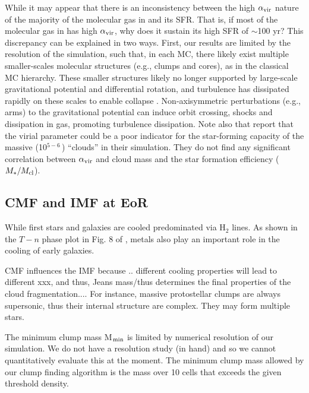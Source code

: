 \documentclass[apj]{emulateapj} %
\begin{document}
{While it may appear that there is an inconsistency between the high $\alpha_{\rm vir}$
nature of the majority of the molecular gas in \flower and its SFR.
That is, if most of the molecular gas in \flower has high $\alpha_{\rm vir}$, why does it sustain its high SFR of $\sim$100\,\Msun\,yr\pmOne?
This discrepancy can be explained in two ways.
First, our results are limited by the resolution of the simulation, such that, in each MC, there
likely exist multiple smaller-scales molecular structures (e.g., clumps and cores),
as in the classical MC hierarchy. These smaller structures likely no longer supported by large-scale gravitational potential and differential rotation,
and turbulence has dissipated rapidly on these scales to enable collapse \citep{Clark04a}.
Non-axisymmetric perturbations (e.g., arms) to the gravitational potential
can induce orbit crossing, shocks and dissipation in gas, promoting turbulence dissipation.
Note also that \citet{Pettitt18a} report that the virial parameter could be a poor indicator
for the star-forming capacity of the massive (10$^{5-6}$\,\Msun) ``clouds'' in their simulation. They
do not find any significant correlation between $\alpha_{\rm vir}$ and cloud mass
and the star formation efficiency ($M_*/M_{\rm cl}$).


\subsection{CMF and IMF at EoR}

While first stars and galaxies are cooled predominated via H$_2$ lines.
As shown in the $T-n$ phase plot in Fig. 8 of \citealt{Pallottini17b}, metals also play an important role in the cooling of early galaxies.


CMF influences the IMF because .. different cooling properties will lead to different xxx, and thus, Jeans mass/thus determines the final properties of the cloud fragmentation....  For instance, massive protostellar clumps are always supersonic, thus their internal structure are complex. They may form multiple stars.


The minimum clump mass M$_{\rm min}$ is limited by numerical resolution of our simulation. We do not have a resolution study (in hand) and so we cannot quantitatively evaluate this at the moment. The minimum clump mass allowed
by our clump finding algorithm is the mass over 10 cells that exceeds the given threshold density.



}
\end{document}
